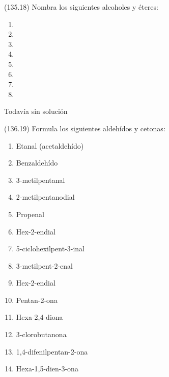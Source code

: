   \begin{exercise}[
      tags    = {},
      topics  = {química, química orgánica, orgánica},
      source  = {FQ 1B MGH 2016, p135, e18},
    ]
    (135.18) Nombra los siguientes alcoholes y éteres:
    \begin{enumerate}
      \item {}
      \item {}
      \item {}
      \item {}
      \item {}
      \item {}
      \item {}
      \item {}
    \end{enumerate}
  \end{exercise}

  \begin{solution}[print=false]
    Todavía sin solución
  \end{solution}




  \begin{exercise}[
      tags    = {},
      topics  = {química, química orgánica, orgánica},
      source  = {FQ 1B MGH 2016, p136, e19},
    ]
    (136.19) Formula los siguientes aldehídos y cetonas:
    \begin{enumerate}
      \item Etanal (acetaldehído)
      \item Benzaldehído
      \item 3-metilpentanal
      \item 2-metilpentanodial
      \item Propenal
      \item Hex-2-endial
      \item 5-ciclohexilpent-3-inal
      \item 3-metilpent-2-enal
      \item Hex-2-endial
      \item Pentan-2-ona
      \item Hexa-2,4-diona
      \item 3-clorobutanona
      \item 1,4-difenilpentan-2-ona
      \item Hexa-1,5-dien-3-ona
    \end{enumerate}
  \end{exercise}

